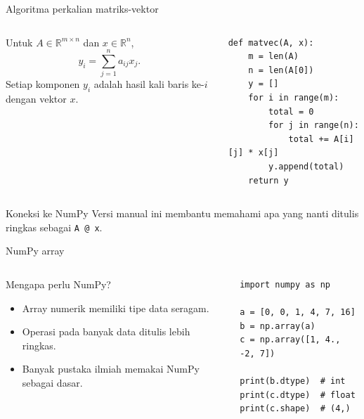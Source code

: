 \documentclass[aspectratio=169,11pt]{beamer}
\begin{document}
\begin{frame}[fragile]{Algoritma perkalian matriks-vektor}
\begin{columns}[T]
Untuk $A\in\mathbb{R}^{m\times n}$ dan $x\in\mathbb{R}^n$,
\[
y_i=\sum_{j=1}^{n} a_{ij}x_j.
\]
Setiap komponen $y_i$ adalah hasil kali baris ke-$i$ dengan vektor $x$.
\begin{lstlisting}
def matvec(A, x):
    m = len(A)
    n = len(A[0])
    y = []
    for i in range(m):
        total = 0
        for j in range(n):
            total += A[i][j] * x[j]
        y.append(total)
    return y
\end{lstlisting}
\end{columns}
\begin{block}{Koneksi ke NumPy}
Versi manual ini membantu memahami apa yang nanti ditulis ringkas sebagai \texttt{A @ x}.
\end{block}
\end{frame}

\begin{frame}[fragile]{NumPy array}
\begin{columns}[T]
\begin{block}{Mengapa perlu NumPy?}
\begin{itemize}
  \item Array numerik memiliki tipe data seragam.
  \item Operasi pada banyak data ditulis lebih ringkas.
  \item Banyak pustaka ilmiah memakai NumPy sebagai dasar.
\end{itemize}
\end{block}
\begin{lstlisting}
import numpy as np

a = [0, 0, 1, 4, 7, 16]
b = np.array(a)
c = np.array([1, 4., -2, 7])

print(b.dtype)  # int
print(c.dtype)  # float
print(c.shape)  # (4,)
\end{lstlisting}
\end{columns}
\end{frame}
\end{document}
